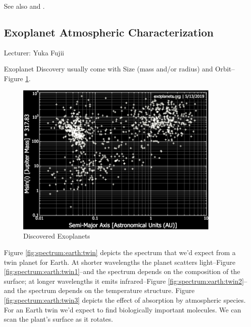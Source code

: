 \documentclass[]{article}
\begin{document}
See also \cite{fujii2018exoplanet} and \cite{villanueva2015unique}.

\subsection{Exoplanet Atmospheric Characterization}

Lecturer: Yuka Fujii

Exoplanet Discovery usually come with Size (mass and/or radius) and Orbit--Figure \ref{fig:discovered:exoplanets}.

\begin{figure}[H]
	\caption{Discovered Exoplanets}\label{fig:discovered:exoplanets}
	\includegraphics[width=0.9\textwidth]{ExoplanetCharacteristics}
\end{figure} 

Figure \ref{fig:spectrum:earth:twin} depicts the spectrum that we'd expect from a twin planet for Earth. At shorter wavelengths the planet scatters light--Figure \ref{fig:spectrum:earth:twin1}--and the spectrum depends on the composition of the surface; at longer wavelengths it emits infrared--Figure \ref{fig:spectrum:earth:twin2}-- and the spectrum depends on the temperature structure. Figure \ref{fig:spectrum:earth:twin3} depicts the effect of absorption by atmospheric species. For an Earth twin we'd expect to find biologically important molecules. We can scan the plant's surface as it rotates.
\end{document}
